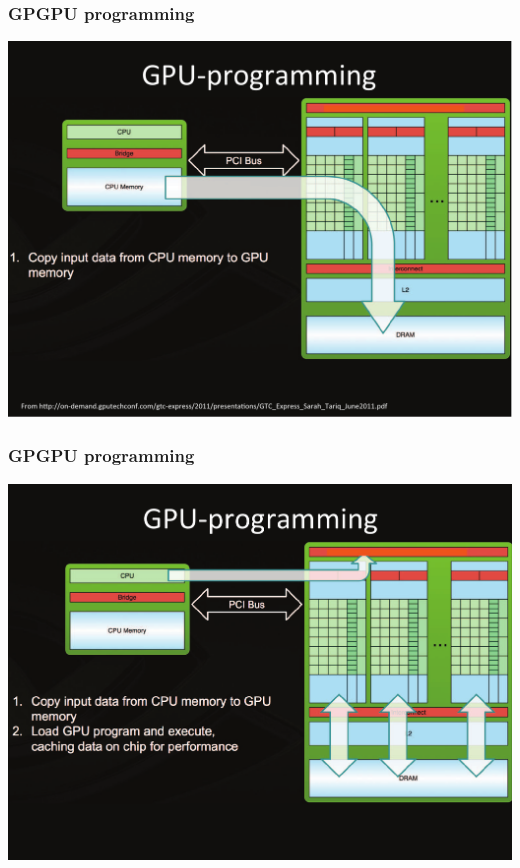 \documentclass{beamer}
\begin{document}
\begin{frame}[fragile,t]
\frametitle{GPGPU programming}

\begin{center}
\includegraphics[height=43ex]{Figures/Lab1/MemCpy1.pdf}
\end  {center}

\end{frame}

\begin{frame}[fragile,t]
\frametitle{GPGPU programming}

\begin{center}
\includegraphics[height=43ex]{Figures/Lab1/MemCpy2.pdf}
\end  {center}

\end{frame}
\end{document}
